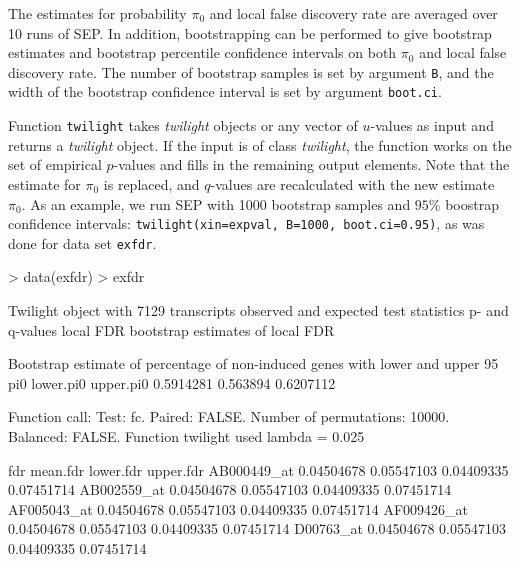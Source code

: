 \documentclass[11pt,a4paper,fleqn]{report}
\newcommand{\Robject}[1]{{\texttt{#1}}}
\newcommand{\Rfunction}[1]{{\texttt{#1}}}
\newcommand{\Rclass}[1]{{\textit{#1}}}
\newcommand{\Rfunarg}[1]{{\texttt{#1}}}
\begin{document}
The estimates for probability $\pi_0$ and local false discovery rate are averaged over 10 runs of SEP. In addition, bootstrapping can be performed to give bootstrap estimates and bootstrap percentile confidence intervals on both $\pi_0$ and local false discovery rate. The number of bootstrap samples is set by argument \Rfunarg{B}, and the width of the bootstrap confidence interval is set by argument \Rfunarg{boot.ci}.

Function \Rfunction{twilight} takes \Rclass{twilight} objects or any vector of $u$-values as input and returns a \Rclass{twilight} object. If the input is of class \Rclass{twilight}, the function works on the set of empirical $p$-values and fills in the remaining output elements. Note that the estimate for $\pi_0$ is replaced, and $q$-values are recalculated with the new estimate $\pi_0$.
As an example, we run SEP with 1000 bootstrap samples and $95\%$ boostrap confidence intervals: \Rfunction{twilight(xin=expval, B=1000, boot.ci=0.95)}, as was done for data set \Robject{exfdr}.
\begin{Schunk}
\begin{Sinput}
> data(exfdr)
> exfdr
\end{Sinput}
\begin{Soutput}
 Twilight object with
     7129 transcripts
     observed and expected test statistics
     p- and q-values
     local FDR
     bootstrap estimates of local FDR

 Bootstrap estimate of percentage of non-induced
 genes with lower and upper 95% CI:
       pi0 lower.pi0 upper.pi0
 0.5914281  0.563894 0.6207112

 Function call:
 Test: fc. Paired: FALSE. Number of permutations: 10000. Balanced: FALSE. 
 Function twilight used lambda = 0.025 
\end{Soutput}
\end{Schunk}
\begin{Schunk}
\begin{Soutput}
                   fdr   mean.fdr  lower.fdr  upper.fdr
AB000449_at 0.04504678 0.05547103 0.04409335 0.07451714
AB002559_at 0.04504678 0.05547103 0.04409335 0.07451714
AF005043_at 0.04504678 0.05547103 0.04409335 0.07451714
AF009426_at 0.04504678 0.05547103 0.04409335 0.07451714
D00763_at   0.04504678 0.05547103 0.04409335 0.07451714
\end{Soutput}
\end{Schunk}
\end{document}
